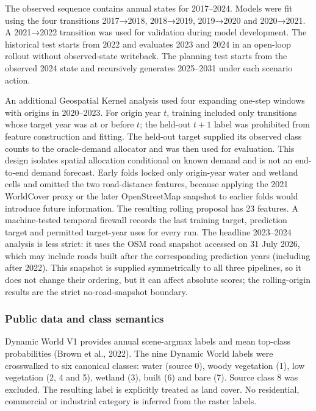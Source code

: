 The observed sequence contains annual states for 2017--2024. Models were
fit using the four transitions 2017→2018, 2018→2019, 2019→2020 and
2020→2021. A 2021→2022 transition was used for validation during model
development. The historical test starts from 2022 and evaluates 2023 and
2024 in an open-loop rollout without observed-state writeback. The
planning test starts from the observed 2024 state and recursively
generates 2025--2031 under each scenario action.

An additional Geospatial Kernel analysis used four expanding one-step
windows with origins in 2020--2023. For origin year \(t\), training
included only transitions whose target year was at or before \(t\); the
held-out \(t+1\) label was prohibited from feature construction and
fitting. The held-out target supplied its observed class counts to the
oracle-demand allocator and was then used for evaluation. This design
isolates spatial allocation conditional on known demand and is not an
end-to-end demand forecast. Early folds locked only origin-year water
and wetland cells and omitted the two road-distance features, because
applying the 2021 WorldCover proxy or the later OpenStreetMap snapshot
to earlier folds would introduce future information. The resulting
rolling proposal has 23 features. A machine-tested temporal firewall
records the last training target, prediction target and permitted
target-year uses for every run. The headline 2023--2024 analysis is less
strict: it uses the OSM road snapshot accessed on 31 July 2026, which
may include roads built after the corresponding prediction years
(including after 2022). This snapshot is supplied symmetrically to all
three pipelines, so it does not change their ordering, but it can affect
absolute scores; the rolling-origin results are the strict
no-road-snapshot boundary.

\subsubsection{Public data and class
semantics}\label{public-data-and-class-semantics}

Dynamic World V1 provides annual scene-argmax labels and mean top-class
probabilities (Brown et al., 2022). The nine Dynamic World labels were
crosswalked to six canonical classes: water (source 0), woody vegetation
(1), low vegetation (2, 4 and 5), wetland (3), built (6) and bare (7).
Source class 8 was excluded. The resulting label is explicitly treated
as land cover. No residential, commercial or industrial category is
inferred from the raster labels.

